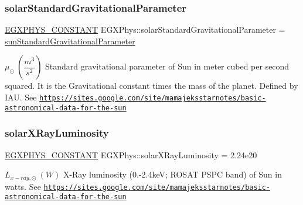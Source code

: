 \subsubsection{\texorpdfstring{solar\+Standard\+Gravitational\+Parameter}{solarStandardGravitationalParameter}}
{\footnotesize\ttfamily \mbox{\hyperlink{group___e_g_x_phys-_constants-_macros_ga76980d288494ce1714c9ac68a95ba702}{E\+G\+X\+P\+H\+Y\+S\+\_\+\+C\+O\+N\+S\+T\+A\+NT}} E\+G\+X\+Phys\+::solar\+Standard\+Gravitational\+Parameter = \mbox{\hyperlink{group___e_g_x_phys-_constants-_astrophysics-_solar_system-_sun-_bulk_ga17d411dceb8d2ff98b8a270eaa72117d}{sun\+Standard\+Gravitational\+Parameter}}}

$ \mu_{\odot} \ (\dfrac{m^3}{s^2})$ Standard gravitational parameter of Sun in meter cubed per second squared. It is the Gravitational constant times the mass of the planet. Defined by I\+AU. See \href{https://sites.google.com/site/mamajeksstarnotes/basic-astronomical-data-for-the-sun}{\tt https\+://sites.\+google.\+com/site/mamajeksstarnotes/basic-\/astronomical-\/data-\/for-\/the-\/sun} \mbox{\label{group___e_g_x_phys-_constants-_astrophysics-_solar_system-_sun-_bulk_ga6d7d3e1d14eb0b8aaba38805a0200ee3}} 
\subsubsection{\texorpdfstring{solar\+X\+Ray\+Luminosity}{solarXRayLuminosity}}
{\footnotesize\ttfamily \mbox{\hyperlink{group___e_g_x_phys-_constants-_macros_ga76980d288494ce1714c9ac68a95ba702}{E\+G\+X\+P\+H\+Y\+S\+\_\+\+C\+O\+N\+S\+T\+A\+NT}} E\+G\+X\+Phys\+::solar\+X\+Ray\+Luminosity = 2.\+24e20}

$L_{x-ray,\odot} \ (W)$ X-\/\+Ray luminosity (0.-\/2.\+4keV; R\+O\+S\+AT P\+S\+PC band) of Sun in watts. See \href{https://sites.google.com/site/mamajeksstarnotes/basic-astronomical-data-for-the-sun}{\tt https\+://sites.\+google.\+com/site/mamajeksstarnotes/basic-\/astronomical-\/data-\/for-\/the-\/sun} \mbox{\label{group___e_g_x_phys-_constants-_astrophysics-_solar_system-_sun-_bulk_ga940159140fc0eb1f661748d424b26b51}} 
